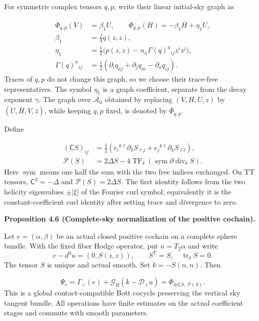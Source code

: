 \documentclass[
  english,
  11pt,
  reqno]{amsart}
\makeatletter
\newcommand{\pandocstatementheading}[1]{%
  \par\addpenalty{\@beginparpenalty}%
  \addvspace{.5\baselineskip plus .2\baselineskip minus .2\baselineskip}%
  {\normalfont\bfseries #1\par}%
  \nobreak\@afterindenttrue\@afterheading
}
\makeatother
\begin{document}
For symmetric complex tensors \(q,p\), write their linear initial-sky
graph as

\label{eq:online-linear-tensor-bott-graph} \[
\begin{aligned}
\dot\Phi_{q,p}(V)&=\beta_1U,\qquad
\dot\Phi_{q,p}(H)=-\beta_1\bar H+\eta_1U,\\
\beta_1&=\frac f4q(z,z),\\
\eta_1&=\frac12\bigl(p(z,z)-n_a\Gamma(q)^a{}_{ij}z^iz^j\bigr),\\
\Gamma(q)^a{}_{ij}
&=\frac12(\partial_iq_{aj}+\partial_jq_{ai}-\partial_aq_{ij}).
\end{aligned}
\] Traces of \(q,p\) do not change this graph, so we choose their
trace-free representatives. The symbol \(\eta_1\) is a graph
coefficient, separate from the decay exponent \(\gamma\). The graph over
\(\overline{\mathcal A}_0\) obtained by replacing \((V,H,U,z)\) by
\((U,\bar H,V,\bar z)\), while keeping \(q,p\) fixed, is denoted by
\(\dot{\bar\Phi}_{q,p}\).

Define

\label{eq:online-contact-curl-and-momentum-operators} \[
\begin{aligned}
(\mathsf CS)_{ij}
&=\frac12\left(\epsilon_i{}^{k\ell}\partial_kS_{\ell j}
             +\epsilon_j{}^{k\ell}\partial_kS_{\ell i}\right),\\
\mathcal P(S)
&=2\Delta S-4\operatorname{TF}_\delta
               (\operatorname{sym}\partial\operatorname{div}_\delta S).
\end{aligned}
\] Here \(\operatorname{sym}\) means one half the sum with the two free
indices exchanged. On TT tensors, \(\mathsf C^2=-\Delta\) and
\(\mathcal P(S)=2\Delta S\). The first identity follows from the two
helicity eigenvalues \(\pm|\xi|\) of the Fourier curl symbol;
equivalently it is the constant-coefficient curl identity after setting
trace and divergence to zero.

\pandocstatementheading{\leavevmode{}\label{prop:online-positive-marked-sky-response}Proposition 4.6 (Complete-sky normalization of the positive cochain).}

Let \(e=(\alpha,\beta)\) be an actual closed positive cochain on a
complete sphere bundle. With the fixed fiber Hodge operator, put
\(u=T_2\alpha\) and write \[
e-d^0u=(0,S(z,z)),\qquad S^{\mathsf T}=S,\quad\operatorname{tr}_\delta S=0.
\] The tensor \(S\) is unique and actual smooth. Set \(k=-S(n,n)\). Then

\label{eq:online-positive-normalized-sky-response} \[
\Psi_e=\Gamma_+(e)+\mathcal G_B(k-\mathcal D_+u)
      =\dot\Phi_{4i\mathsf CS,\,\mathcal P(S)}.
\] This is a global contact-compatible Bott cocycle preserving the
vertical sky tangent bundle. All operations have finite estimates on the
actual coefficient stages and commute with smooth parameters.
\end{document}
